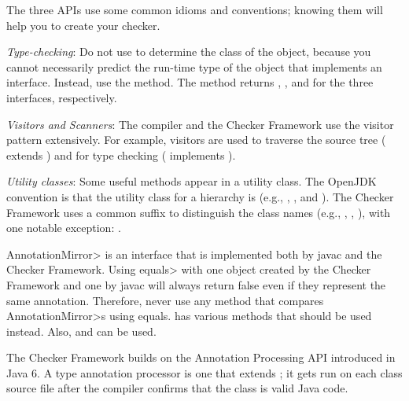 The three APIs use some common idioms and conventions; knowing them will
help you to create your checker.

\emph{Type-checking}:
Do not use  to determine the class of the object,
because you cannot necessarily predict the run-time type of the object that
implements an interface.  Instead, use the  method.  The
method returns ,
, and 
for the three interfaces, respectively.

\emph{Visitors and Scanners}:
The compiler and the Checker Framework use the visitor pattern
extensively. For example, visitors are used to traverse the source tree
( extends
) and for type
checking ( implements
).

\emph{Utility classes}:
Some useful methods appear in a utility class.  The OpenJDK convention is that
the utility class for a  hierarchy is  (e.g.,
, , and
).  The Checker Framework uses a common
 suffix to distinguish the class names (e.g., ,
, ), with one
notable exception: .



\<AnnotationMirror> is an interface that is implemented both by javac and
the Checker Framework. Using \<equals> with one object created by the
Checker Framework and one by javac will always return false even if they
represent the same annotation. Therefore, never use any method that
compares \<AnnotationMirror>s using equals.  has various
methods that should be used instead. Also,
 and
 can be used.



The Checker Framework builds on the Annotation Processing API
introduced in Java 6.  A type annotation processor is one that extends
; it gets run on each class
source file after the compiler confirms that the class is valid Java code.

